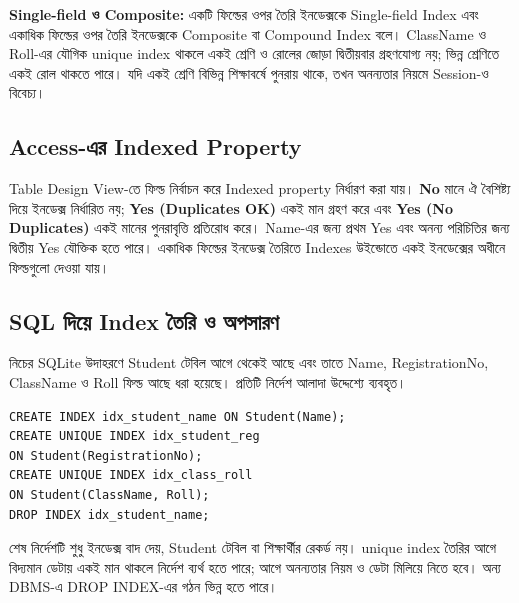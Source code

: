 \textbf{Single-field ও Composite:} একটি ফিল্ডের ওপর তৈরি ইনডেক্সকে Single-field Index এবং একাধিক ফিল্ডের ওপর তৈরি ইনডেক্সকে Composite বা Compound Index বলে। ClassName ও Roll-এর যৌগিক unique index থাকলে একই শ্রেণি ও রোলের জোড়া দ্বিতীয়বার গ্রহণযোগ্য নয়; ভিন্ন শ্রেণিতে একই রোল থাকতে পারে। যদি একই শ্রেণি বিভিন্ন শিক্ষাবর্ষে পুনরায় থাকে, তখন অনন্যতার নিয়মে Session-ও বিবেচ্য।

\subsection{Access-এর Indexed Property}
Table Design View-তে ফিল্ড নির্বাচন করে Indexed property নির্ধারণ করা যায়। \textbf{No} মানে ঐ বৈশিষ্ট্য দিয়ে ইনডেক্স নির্ধারিত নয়; \textbf{Yes (Duplicates OK)} একই মান গ্রহণ করে এবং \textbf{Yes (No Duplicates)} একই মানের পুনরাবৃত্তি প্রতিরোধ করে। Name-এর জন্য প্রথম Yes এবং অনন্য পরিচিতির জন্য দ্বিতীয় Yes যৌক্তিক হতে পারে। একাধিক ফিল্ডের ইনডেক্স তৈরিতে Indexes উইন্ডোতে একই ইনডেক্সের অধীনে ফিল্ডগুলো দেওয়া যায়।


\subsection{SQL দিয়ে Index তৈরি ও অপসারণ}
নিচের SQLite উদাহরণে Student টেবিল আগে থেকেই আছে এবং তাতে Name, RegistrationNo, ClassName ও Roll ফিল্ড আছে ধরা হয়েছে। প্রতিটি নির্দেশ আলাদা উদ্দেশ্যে ব্যবহৃত।
\begin{verbatim}
CREATE INDEX idx_student_name ON Student(Name);
CREATE UNIQUE INDEX idx_student_reg
ON Student(RegistrationNo);
CREATE UNIQUE INDEX idx_class_roll
ON Student(ClassName, Roll);
DROP INDEX idx_student_name;
\end{verbatim}
শেষ নির্দেশটি শুধু ইনডেক্স বাদ দেয়, Student টেবিল বা শিক্ষার্থীর রেকর্ড নয়। unique index তৈরির আগে বিদ্যমান ডেটায় একই মান থাকলে নির্দেশ ব্যর্থ হতে পারে; আগে অনন্যতার নিয়ম ও ডেটা মিলিয়ে নিতে হবে। অন্য DBMS-এ DROP INDEX-এর গঠন ভিন্ন হতে পারে।

